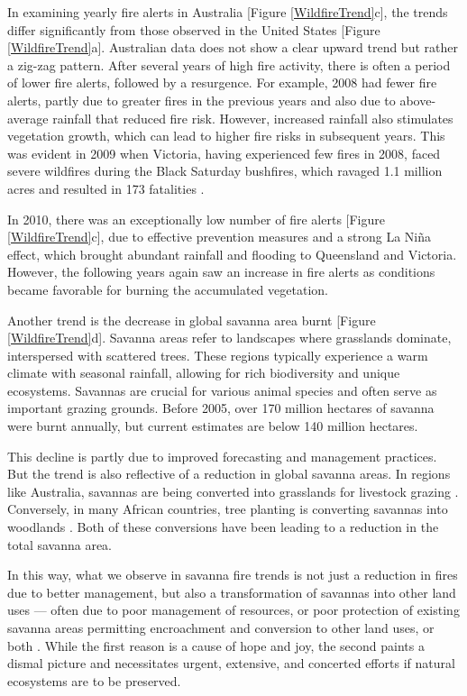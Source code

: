 \documentclass[
  12 pt,
]{Nemilov}
\begin{document}
In examining yearly fire alerts in Australia {[}Figure \ref{WildfireTrend}c{]}, the trends differ significantly from those observed in the United States {[}Figure \ref{WildfireTrend}a{]}. Australian data does not show a clear upward trend but rather a zig-zag pattern. After several years of high fire activity, there is often a period of lower fire alerts, followed by a resurgence. For example, 2008 had fewer fire alerts, partly due to greater fires in the previous years and also due to above-average rainfall that reduced fire risk. However, increased rainfall also stimulates vegetation growth, which can lead to higher fire risks in subsequent years. This was evident in 2009 when Victoria, having experienced few fires in 2008, faced severe wildfires during the Black Saturday bushfires, which ravaged 1.1 million acres and resulted in 173 fatalities \citep{cameron2009black}.

In 2010, there was an exceptionally low number of fire alerts {[}Figure \ref{WildfireTrend}c{]}, due to effective prevention measures and a strong La Niña effect, which brought abundant rainfall and flooding to Queensland and Victoria. However, the following years again saw an increase in fire alerts as conditions became favorable for burning the accumulated vegetation.

Another trend is the decrease in global savanna area burnt {[}Figure \ref{WildfireTrend}d{]}. Savanna areas refer to landscapes where grasslands dominate, interspersed with scattered trees. These regions typically experience a warm climate with seasonal rainfall, allowing for rich biodiversity and unique ecosystems. Savannas are crucial for various animal species and often serve as important grazing grounds. Before 2005, over 170 million hectares of savanna were burnt annually, but current estimates are below 140 million hectares.

This decline is partly due to improved forecasting and management practices. But the trend is also reflective of a reduction in global savanna areas. In regions like Australia, savannas are being converted into grasslands for livestock grazing \citep{hoffmann2000vegetation}. Conversely, in many African countries, tree planting is converting savannas into woodlands \citep{armstrong1998plantation, parr2024conflation}. Both of these conversions have been leading to a reduction in the total savanna area.

In this way, what we observe in savanna fire trends is not just a reduction in fires due to better management, but also a transformation of savannas into other land uses --- often due to poor management of resources, or poor protection of existing savanna areas permitting encroachment and conversion to other land uses, or both \citep{jepson2005disappearing}. While the first reason is a cause of hope and joy, the second paints a dismal picture and necessitates urgent, extensive, and concerted efforts if natural ecosystems are to be preserved.
\end{document}
